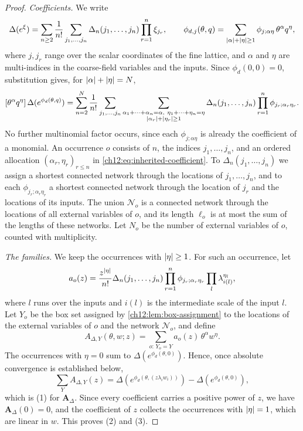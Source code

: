\begin{proof}
\emph{Coefficients.} We write
\[
 \Delta(e^\xi)=\sum_{n\ge2}\frac1{n!}\sum_{j_1,\ldots,j_n}\Delta_n(j_1,\ldots,j_n)\prod_{r=1}^n\xi_{j_r},
 \qquad
 \phi_{d,j}(\theta,q)=\sum_{\lvert \alpha\rvert+\lvert \eta\rvert\ge1}\phi_{j;\alpha\eta}\,\theta^\alpha q^\eta ,
\]
where $j,j_r$ range over the scalar coordinates of the fine lattice, and $\alpha$ and $\eta$ are multi-indices in the coarse-field variables and the inputs. Since $\phi_d(0,0)=0$, substitution gives, for $\lvert \alpha\rvert+\lvert \eta\rvert=N$,
\begin{equation}\label{ch12:eq:inherited-coefficient}
 [\theta^\alpha q^\eta]\,\Delta(e^{\phi_d(\theta,q)})
 =\sum_{n=2}^N\frac1{n!}\sum_{j_1,\ldots,j_n}
 \sum_{\substack{\alpha_1+\cdots+\alpha_n=\alpha,\ \eta_1+\cdots+\eta_n=\eta\\ \abs{\alpha_r}+\abs{\eta_r}\ge1}}
 \Delta_n(j_1,\ldots,j_n)\prod_{r=1}^n\phi_{j_r;\alpha_r\eta_r}.
\end{equation}
No further multinomial factor occurs, since each $\phi_{j;\alpha\eta}$ is already the coefficient of a monomial. An occurrence $o$ consists of $n$, the indices $j_1,\ldots,j_n$, and an ordered allocation $(\alpha_r,\eta_r)_{r\le n}$ in \eqref{ch12:eq:inherited-coefficient}. To $\Delta_n(j_1,\ldots,j_n)$ we assign a shortest connected network through the locations of $j_1,\ldots,j_n$, and to each $\phi_{j_r;\alpha_r\eta_r}$ a shortest connected network through the location of $j_r$ and the locations of its inputs. The union $\mathcal N_o$ is a connected network through the locations of all external variables of $o$, and its length $\ell_o$ is at most the sum of the lengths of these networks. Let $N_o$ be the number of external variables of $o$, counted with multiplicity.

\emph{The families.} We keep the occurrences with $\lvert \eta\rvert\ge1$. For such an occurrence, let
\[
 a_o(z)=\frac{z^{\lvert \eta\rvert}}{n!}\Delta_n(j_1,\ldots,j_n)\prod_{r=1}^n\phi_{j_r;\alpha_r\eta_r}\prod_l\lambda_{i(l)}^{\eta_l},
\]
where $l$ runs over the inputs and $i(l)$ is the intermediate scale of the input $l$. Let $Y_o$ be the box set assigned by \cref{ch12:lem:box-assignment} to the locations of the external variables of $o$ and the network $\mathcal N_o$, and define
\[
 A_{\Delta,Y}(\theta,w;z)=\sum_{o:\,Y_o=Y}a_o(z)\,\theta^\alpha w^\eta .
\]
The occurrences with $\eta=0$ sum to $\Delta(e^{\phi_d(\theta,0)})$. Hence, once absolute convergence is established below,
\[
 \sum_YA_{\Delta,Y}(z)=\Delta(e^{\phi_d(\theta,(z\lambda_iw_i))})-\Delta(e^{\phi_d(\theta,0)}),
\]
which is (1) for $\boldsymbol A_\Delta$. Since every coefficient carries a positive power of $z$, we have $\boldsymbol A_\Delta(0)=0$, and the coefficient of $z$ collects the occurrences with $\lvert \eta\rvert=1$, which are linear in $w$. This proves (2) and (3).


\end{proof}
